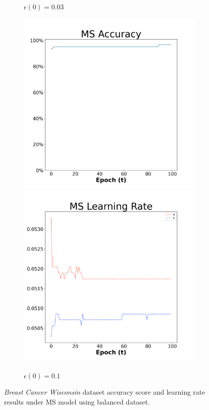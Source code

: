 \begin{figure}[H]
\begin{subfigure}{0.3\textwidth}
  \caption{$\epsilon(0)=0.03$}
\end{subfigure}\hfil %
\begin{subfigure}{0.3\textwidth}
  \includegraphics[width=\linewidth]{images/exper1/breast/MS_0.1_acc.png}
  \includegraphics[width=\linewidth]{images/exper1/breast/MS_0.1_lr.png}
  \caption{$\epsilon(0)=0.1$}
\end{subfigure}

\caption{\textit{Breast Cancer Wisconsin} dataset accuracy score and learning rate results under MS model using balanced dataset.}
\end{figure}

